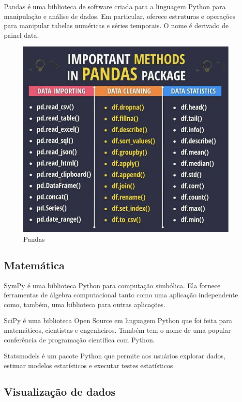 Pandas é uma biblioteca de software criada para a linguagem Python para manipulação e análise de dados. 
Em particular, oferece estruturas e operações para manipular tabelas numéricas e séries temporais. 
O nome é derivado de painel data.

\begin{figure}[!htp]
    \centering
    \includegraphics[scale=.9]{../img/python/pandas.jpeg}
    \caption{Pandas}
    \label{img:pandas}
\end{figure}

\subsection{Matemática}

SymPy é uma biblioteca Python para computação simbólica. 
Ela fornece ferramentas de álgebra computacional tanto como uma aplicação independente como, também, uma biblioteca para outras aplicações.

SciPy é uma biblioteca Open Source em linguagem Python que foi feita para matemáticos, cientistas e engenheiros. 
Também tem o nome de uma popular conferência de programação científica com Python.

Statsmodels é um pacote Python que permite aos usuários explorar dados, estimar modelos estatísticos e executar testes estatísticos

\subsection{Visualização de dados}

